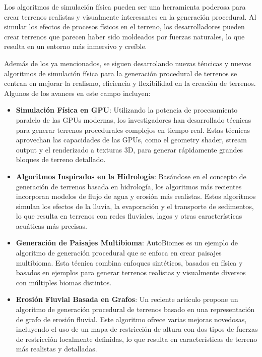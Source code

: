 Los algoritmos de simulación física pueden ser una herramienta poderosa para crear terrenos realistas y visualmente interesantes en la generación procedural. Al simular los efectos de procesos físicos en el terreno, los desarrolladores pueden crear terrenos que parecen haber sido moldeados por fuerzas naturales, lo que resulta en un entorno más inmersivo y creíble. 

Además de los ya mencionados, se siguen desarrolando nuevas téncicas y nuevos algoritmos de simulación física para la generación procedural de terrenos se centran en mejorar la realismo, eficiencia y flexibilidad en la creación de terrenos. Algunos de los avances en este campo incluyen:

\begin{itemize}
    \item \textbf{Simulación Física en GPU}: Utilizando la potencia de procesamiento paralelo de las GPUs modernas, los investigadores han desarrollado técnicas para generar terrenos procedurales complejos en tiempo real. Estas técnicas aprovechan las capacidades de las GPUs, como el geometry shader, stream output y el renderizado a texturas 3D, para generar rápidamente grandes bloques de terreno detallado\cite{SimulacionFisicaGPU}.
    
    \item \textbf{Algoritmos Inspirados en la Hidrología}: Basándose en el concepto de generación de terrenos basada en hidrología, los algoritmos más recientes incorporan modelos de flujo de agua y erosión más realistas. Estos algoritmos simulan los efectos de la lluvia, la evaporación y el transporte de sedimentos, lo que resulta en terrenos con redes fluviales, lagos y otras características acuáticas más precisas\cite{AlgoritmosHidrologia}.
    
    \item \textbf{Generación de Paisajes Multibioma}: AutoBiomes es un ejemplo de algoritmo de generación procedural que se enfoca en crear paisajes multibioma. Esta técnica combina enfoques sintéticos, basados en física y basados en ejemplos para generar terrenos realistas y visualmente diversos con múltiples biomas distintos\cite{GeneracionMultiBioma}.
    
    \item \textbf{Erosión Fluvial Basada en Grafos}: Un reciente artículo propone un algoritmo de generación procedural de terrenos basado en una representación de grafo de erosión fluvial. Este algoritmo ofrece varias mejoras novedosas, incluyendo el uso de un mapa de restricción de altura con dos tipos de fuerzas de restricción localmente definidas, lo que resulta en características de terreno más realistas y detalladas\cite{ErosionBasadaGrafos}.
    
\end{itemize}


